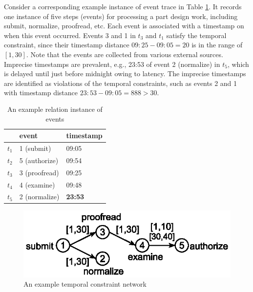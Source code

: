 \documentclass{article}
\newlength{\figwidths}
\begin{document}
Consider a corresponding example instance of event trace in Table \ref{table-temporal-event}.
It records one instance of five steps (events) for processing a part design work, including \textsf{submit, normalize, proofread}, etc.
Each event is associated with a timestamp on when this event occurred. 
%
Events 3 and 1 in $t_3$ and $t_1$ satisfy the temporal constraint, since their timestamp distance $09{:}25-09{:}05=20$ is in the range of $[1,30]$.
%
Note that the events are collected from various external sources. 
Imprecise timestamps are prevalent, e.g., {23:53} of event 2 (\textsf{normalize}) in $t_5$, which is delayed until just before midnight owing to latency.
The imprecise timestamps are identified as violations of the temporal constraints, such as events 2 and 1 with timestamp distance $23{:}53-09{:}05=888>30$.

 \begin{table}
 \centering\small
 \caption{An example relation instance of events} 
 \label{table-temporal-event}
 \begin{tabular}{lll}
 \toprule
 & \textsf{event} & \textsf{timestamp}  \\ 
 \midrule 
 $t_1$ & 1 (\textsf{submit})    & 09:05 \\ 
 $t_2$ & 5 (\textsf{authorize}) & 09:54 \\ 
 $t_3$ & 3 (\textsf{proofread}) & 09:25 \\ 
 $t_4$ & 4 (\textsf{examine})   & 09:48 \\ 
 $t_5$ & 2 (\textsf{normalize}) & \textbf{23:53} \\ 
 \bottomrule
 \end{tabular}
 \end{table}



\begin{figure}[t]
\centering
\includegraphics[width=0.8\figwidths]{fig/temporal-event}
\caption{An example temporal constraint network}
\label{fig-temporal-event}
\end{figure}
\end{document}
